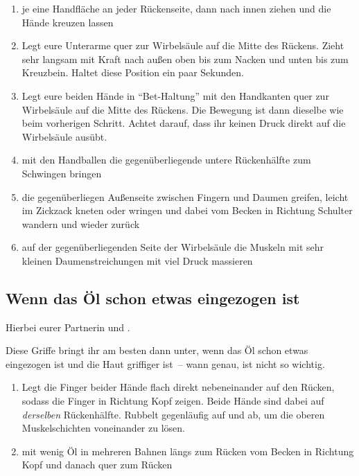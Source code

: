 \begin{oframed}
  \begin{enumerate}
    \item {} je eine Handfläche an jeder Rückenseite, dann nach innen ziehen und die Hände kreuzen lassen
    \item {} Legt eure Unterarme quer zur Wirbelsäule auf die Mitte des Rückens. Zieht sehr langsam mit Kraft nach außen oben bis zum Nacken und unten bis zum Kreuzbein. Haltet diese Position ein paar Sekunden.
    \item {} Legt eure beiden Hände in "`Bet-Haltung"' mit den Handkanten quer zur Wirbelsäule auf die Mitte des Rückens. Die Bewegung ist dann dieselbe wie beim vorherigen Schritt. Achtet darauf, dass ihr keinen Druck direkt auf die Wirbelsäule ausübt.
    \item {} mit den Handballen die gegenüberliegende untere Rückenhälfte zum Schwingen bringen
    \item {} die gegenüberliegen Außenseite zwischen Fingern und Daumen greifen, leicht im Zickzack kneten oder wringen und dabei vom Becken in Richtung Schulter wandern und wieder zurück
    \item {} auf der gegenüberliegenden Seite der Wirbelsäule die Muskeln mit sehr kleinen Daumenstreichungen mit viel Druck massieren
  \end{enumerate}
\end{oframed}

\subsection{Wenn das Öl schon etwas eingezogen ist}

Hierbei  eurer Partnerin und .

Diese Griffe bringt ihr am besten dann unter, wenn das Öl schon etwas eingezogen ist und die Haut griffiger ist~-- wann genau, ist nicht so wichtig.

\begin{enumerate}
  \item {} Legt die Finger beider Hände flach direkt nebeneinander auf den Rücken, sodass die Finger in Richtung Kopf zeigen. Beide Hände sind dabei auf \emph{derselben} Rückenhälfte. Rubbelt gegenläufig auf und ab, um die oberen Muskelschichten voneinander zu lösen.
  \item {} mit wenig Öl in mehreren Bahnen längs zum Rücken vom Becken in Richtung Kopf und danach quer zum Rücken
\end{enumerate}

